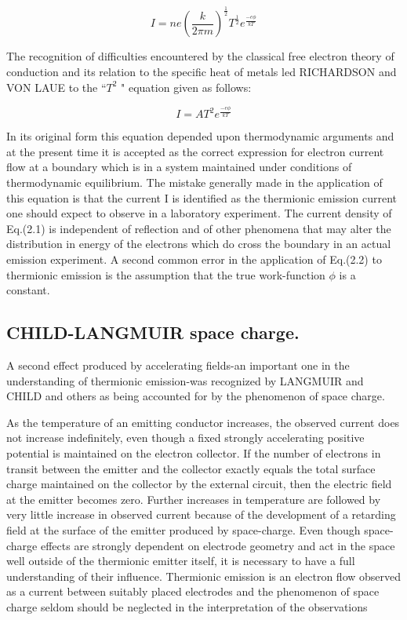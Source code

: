 \documentclass[11pt,a4paper]{article}
\begin{document}
	\begin{equation}
		I = ne (\frac{k}{2 \pi m})^\frac{1}{2} T^\frac{1}{2} e^\frac{- e \phi}{k T}
	\end{equation}

The recognition of difficulties encountered by the classical free electron theory
of conduction and its relation to the specific heat of metals led RICHARDSON
and VON LAUE to the ``$T^2$ " equation given as follows:

	\begin{equation}
		I = A T^2 e^\frac{- e \phi}{k T}
	\end{equation}

	In its original form this equation depended upon thermodynamic arguments and
	at the present time it is accepted as the correct expression for electron current
	flow at a boundary which is in a system maintained under conditions of thermodynamic equilibrium. The mistake generally made in the application of this
	equation is that the current I is identified as the thermionic emission current one
	should expect to observe in a laboratory experiment. The current density of
	Eq.(2.1) is independent of reflection and of other phenomena that may alter
	the distribution in energy of the electrons which do cross the boundary in an
	actual emission experiment. A second common error in the application of Eq.(2.2)
	to thermionic emission is the assumption that the true work-function $\phi$ is a constant.
	
	\subsection{CHILD-LANGMUIR space charge.}
	
	A second effect produced by accelerating
	fields-an important one in the understanding of thermionic emission-was
	recognized by LANGMUIR and CHILD and others as being accounted for by the
	phenomenon of space charge.
	
	As the temperature of an emitting conductor increases, the observed current
	does not increase indefinitely, even though a fixed strongly accelerating positive
	potential is maintained on the electron collector. If the number of electrons in
	transit between the emitter and the collector exactly equals the total surface
	charge maintained on the collector by the external circuit, then the electric field
	at the emitter becomes zero. Further increases in temperature are followed by
	very little increase in observed current because of the development of a retarding
	field at the surface of the emitter produced by space-charge. Even though
	space-charge effects are strongly dependent on electrode geometry and act in
	the space well outside of the thermionic emitter itself, it is necessary to have a
	full understanding of their influence. Thermionic emission is an electron flow
	observed as a current between suitably placed electrodes and the phenomenon
	of space charge seldom should be neglected in the interpretation of the observations
	
\end{document}
